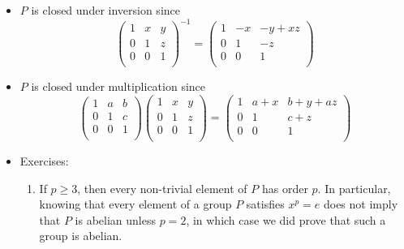 \documentclass[../notes.tex]{subfiles}
\begin{document}
\begin{itemize}
\begin{itemize}
        \item $P$ is closed under inversion since
        \begin{equation*}
            \begin{pmatrix}
                1 & x & y\\
                0 & 1 & z\\
                0 & 0 & 1\\
            \end{pmatrix}^{-1}
            =
            \begin{pmatrix}
                1 & -x & -y+xz\\
                0 & 1 & -z\\
                0 & 0 & 1\\
            \end{pmatrix}
        \end{equation*}
        \item $P$ is closed under multiplication since
        \begin{equation*}
            \begin{pmatrix}
                1 & a & b\\
                0 & 1 & c\\
                0 & 0 & 1\\
            \end{pmatrix}
            \begin{pmatrix}
                1 & x & y\\
                0 & 1 & z\\
                0 & 0 & 1\\
            \end{pmatrix}
            =
            \begin{pmatrix}
                1 & a+x & b+y+az\\
                0 & 1 & c+z\\
                0 & 0 & 1\\
            \end{pmatrix}
        \end{equation*}
        \item Exercises:
        \begin{enumerate}
            \item If $p\geq 3$, then every non-trivial element of $P$ has order $p$. In particular, knowing that every element of a group $P$ satisfies $x^p=e$ does not imply that $P$ is abelian unless $p=2$, in which case we did prove that such a group is abelian.

\end{enumerate}
\end{itemize}
\end{itemize}
\end{document}
